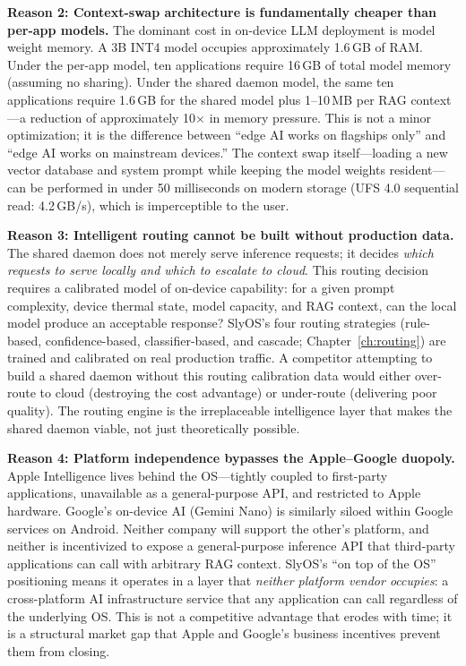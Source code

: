 \documentclass[12pt, letterpaper, twoside]{report}
\begin{document}
\textbf{Reason 2: Context-swap architecture is fundamentally cheaper than per-app models.} The dominant cost in on-device LLM deployment is model weight memory. A 3B INT4 model occupies approximately 1.6\,GB of RAM. Under the per-app model, ten applications require 16\,GB of total model memory (assuming no sharing). Under the shared daemon model, the same ten applications require 1.6\,GB for the shared model plus 1--10\,MB per RAG context---a reduction of approximately 10$\times$ in memory pressure. This is not a minor optimization; it is the difference between ``edge AI works on flagships only'' and ``edge AI works on mainstream devices.'' The context swap itself---loading a new vector database and system prompt while keeping the model weights resident---can be performed in under 50 milliseconds on modern storage (UFS 4.0 sequential read: 4.2\,GB/s), which is imperceptible to the user.

\textbf{Reason 3: Intelligent routing cannot be built without production data.} The shared daemon does not merely serve inference requests; it decides \textit{which requests to serve locally and which to escalate to cloud}. This routing decision requires a calibrated model of on-device capability: for a given prompt complexity, device thermal state, model capacity, and RAG context, can the local model produce an acceptable response? SlyOS's four routing strategies (rule-based, confidence-based, classifier-based, and cascade; Chapter~\ref{ch:routing}) are trained and calibrated on real production traffic. A competitor attempting to build a shared daemon without this routing calibration data would either over-route to cloud (destroying the cost advantage) or under-route (delivering poor quality). The routing engine is the irreplaceable intelligence layer that makes the shared daemon viable, not just theoretically possible.

\textbf{Reason 4: Platform independence bypasses the Apple--Google duopoly.} Apple Intelligence lives behind the OS---tightly coupled to first-party applications, unavailable as a general-purpose API, and restricted to Apple hardware. Google's on-device AI (Gemini Nano) is similarly siloed within Google services on Android. Neither company will support the other's platform, and neither is incentivized to expose a general-purpose inference API that third-party applications can call with arbitrary RAG context. SlyOS's ``on top of the OS'' positioning means it operates in a layer that \textit{neither platform vendor occupies}: a cross-platform AI infrastructure service that any application can call regardless of the underlying OS. This is not a competitive advantage that erodes with time; it is a structural market gap that Apple and Google's business incentives prevent them from closing.
\end{document}
